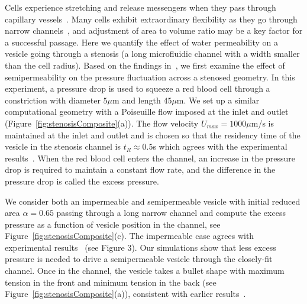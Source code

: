 \documentclass[9pt,twocolumn,twoside,lineno]{pnas-new}
\begin{document}
Cells experience stretching and release messengers when they pass
through capillary vessels~\cite{Wan2008_PNAS, ForsythWan2011_PNAS,
Pak2015_PNAS}.  Many cells exhibit extraordinary flexibility as they go
through narrow channels~\cite{AuStoreyMoore2016_PNAS}, and adjustment of
area to volume ratio may be a key factor for a successful passage.  Here
we quantify the effect of water permeability on a vesicle going through
a stenosis (a long microfluidic channel with a width smaller than the
cell radius).  Based on the findings in~\cite{abk-fai-sto2006}, we first
examine the effect of semipermeability on the pressure fluctuation
across a stenosed geometry. In this experiment, a pressure drop is used
to squeeze a red blood cell through a constriction with diameter $5\mu$m
and length $45\mu$m. We set up a similar computational geometry with a
Poiseuille flow imposed at the inlet and outlet
(Figure~\ref{fig:stenosisComposite}(a)). The flow velocity $U_{max} =
1000 \mu$m/s is maintained at the inlet and outlet and is chosen so that the residency time of the vesicle in the
stenosis channel is $t_R \approx 0.5$s which agrees with the
experimental results~\cite{abk-fai-sto2006}. When the red blood cell
enters the channel, an increase in the pressure drop is required to
maintain a constant flow rate, and the difference in the pressure drop
is called the excess pressure. 


We consider both an impermeable and semipermeable vesicle with initial
reduced area $\alpha = 0.65$ passing through a long narrow channel and
compute the excess pressure as a function of vesicle position in the
channel, see Figure~\ref{fig:stenosisComposite}(c). The impermeable case
agrees with experimental results~\cite{abk-fai-sto2006} (see Figure 3).
Our simulations show that less excess pressure is needed to drive a
semipermeable vesicle through the closely-fit channel. Once in the
channel, the vesicle takes a bullet shape with maximum tension in the
front and minimum tension in the back (see
Figure~\ref{fig:stenosisComposite}(a)), consistent with earlier
results~\cite{Pak2015_PNAS, HarmanBertrandJoos2017_CJP}.
\end{document}
